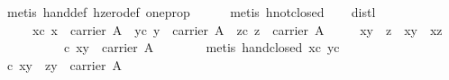 \begin{isabellebody}
\ {}metis\ hand{}def\ hzero{}def\ one{}prop{}\isanewline
\ \ \ \ \isamarkupfalse%
\ {}metis\ hnot{}closed{}%
\endisatagproof
{\isafoldproof}%
%
\isadelimproof
\isanewline
%
\endisadelimproof
\isanewline
\ \ \isamarkupfalse%
\ distl{}\isanewline
\ \ \ \ \ xc{}\ {}x\ {}\ carrier\ A{}\ \ yc{}\ {}y\ {}\ carrier\ A{}\ \ zc{}\ {}z\ {}\ carrier\ A{}\isanewline
\ \ \ \ \ {}x{}{}y\ {}\ z{}\ {}\ x{}y\ {}\ x{}z{}\isanewline
%
\isadelimproof
\ \ %
\endisadelimproof
%
\isatagproof
{}\isamarkupfalse%
\ {}\isanewline
\ \ \ \ \isamarkupfalse%
\ c{}{}\ {}x{}y\ {}\ carrier\ A{}\isanewline
\ \ \ \ \ \ \isamarkupfalse%
\ {}metis\ hand{}closed\ xc\ yc{}\isanewline
\ \ \ \ \isamarkupfalse%
\ c{}{}\ {}x{}{}y\ {}\ z{}{}{}y\ {}\ carrier\ A{}\isanewline

\end{isabellebody}
